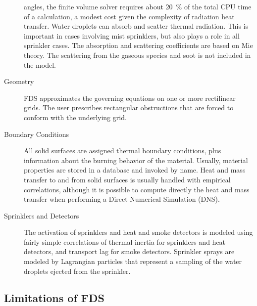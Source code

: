 \documentclass[11pt]{book}
\begin{document}
\begin{description}
angles, the finite volume solver requires about 20~\% of the total CPU
time of a calculation, a modest cost given the complexity of radiation
heat transfer.  Water droplets can absorb and scatter thermal
radiation. This is important in cases involving mist sprinklers, but
also plays a role in all sprinkler cases. The absorption and
scattering coefficients are based on Mie theory. The scattering from
the gaseous species and soot is not included in the model.
\item[Geometry]
FDS approximates the governing equations on one or more rectilinear grids. The
user prescribes rectangular obstructions that are forced to conform
with the underlying grid.
\item[Boundary Conditions]
All solid surfaces are assigned thermal boundary conditions, plus
information about the burning behavior of the material. Usually,
material properties are stored in a database and invoked by name.
Heat and mass transfer to and from solid surfaces is
usually handled with empirical correlations, although it is possible
to compute directly the heat and mass transfer when performing a
Direct Numerical Simulation (DNS).
\item[Sprinklers and Detectors] The activation of sprinklers and heat and smoke detectors
is modeled using fairly simple correlations of thermal inertia for
sprinklers and heat detectors, and transport lag for smoke detectors.
Sprinkler sprays are modeled by Lagrangian particles that represent a sampling of the
water droplets ejected from the sprinkler.
\end{description}


\subsection{Limitations of FDS}
\end{document}
